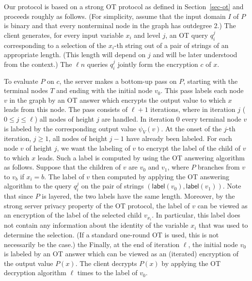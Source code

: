 \documentclass{article}
\newcommand{\lab}{{\mathsf{label}}}
\begin{document}
Our protocol is based on a strong OT protocol as defined in
Section~\ref{sec-ot} and proceeds roughly as follows.  (For
simplicity, assume that the input domain $I$ of $P$ is binary and
that every nonterminal node in the graph has outdegree 2.) The
client generates, for every input variable $x_i$ and level $j$, an
OT query $q^j_i$ corresponding to a selection of the $x_i$-th
string out of a pair of strings of an appropriate length. (This
length will depend on $j$ and will be later understood from the
context.) The $\ell n$ queries $q^j_i$ jointly form the encryption
$c$ of $x$.

To evaluate $P$ on $c$, the server makes a bottom-up pass on $P$,
starting with the terminal nodes $T$ and ending with the initial
node $v_0$. This pass labels each node $v$ in the graph by an OT
answer which encrypts the output value to which $x$ leads from this
node. The pass consists of  $\ell+1$ iterations, where in iteration
$j$ ($0\le j\le \ell$) all nodes of height $j$ are handled. In
iteration 0 every terminal node $v$ is labeled by the corresponding
output value $\psi_V(v)$. At the onset of the $j$-th iteration,
$j\ge 1$, all nodes of height $j-1$ have already been labeled. For
each node $v$ of height $j$, we want the labeling of $v$ to encrypt
the label of the child of $v$ to which $x$ leads. Such a label is
computed by using the OT answering algorithm as follows. Suppose
that the children of $v$ are $v_0$ and $v_1$, where $P$ branches
from $v$ to $v_b$ if $x_i=b$. The label of $v$ then computed by
applying the OT answering algorithm to the query $q^j_i$ on the pair
of strings $(\lab(v_0),\lab(v_1))$. Note that since $P$ is layered,
the two labels have the same length. Moreover, by the strong server
privacy property of the OT protocol, the label of $v$ can be viewed
as an encryption of the label of the selected child $v_{x_i}$. In
particular, this label does not contain any information about the
identity of the variable $x_i$ that was used to determine the
selection. (If a standard one-round OT is used, this is not
necessarily be the case.)
the
Finally, at the end of iteration $\ell$, the initial node $v_0$ is
labeled by an OT answer which can be viewed as an (iterated)
encryption of the output value $P(x)$. The client decrypts $P(x)$
by applying the OT decryption algorithm $\ell$ times to the label
of $v_0$.
\end{document}
